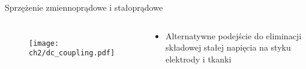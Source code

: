 \begin{frame}{Sprzężenie zmiennoprądowe i stałoprądowe}
\begin{columns}
        \vspace{-3em} %

        \begin{figure}[H]
            \hspace{-2em} %
            \texttt{[image: ch2/dc\_coupling.pdf]}
        \end{figure}


    {\renewcommand\normalsize{\small}%
    \normalsize
    \vspace{-1em} %

        \begin{alertblock}{}

        \begin{itemize}
            \item Alternatywne podejście do eliminacji składowej stałej napięcia na styku elektrody i tkanki
        \end{itemize}
    \end{alertblock}
    }

    \end{columns}

\end{frame}
